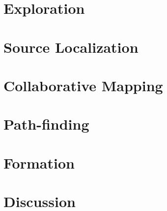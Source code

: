 \documentclass[a4paper]{article}
\begin{document}
 \section{Exploration}
  
 
 \section{Source Localization}
  
 
 \section{Collaborative Mapping}
  
 
 \section{Path-finding}
  
 
 \section{Formation}
  

\section{Discussion}
  




\end{document}
